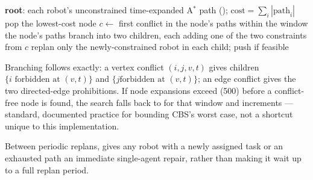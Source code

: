 \begin{algorithm}[H]
\caption{Windowed CBS ()}
\begin{algorithmic}[1]
\State \textbf{root}: each robot's unconstrained time-expanded A$^\ast$ path
  (); $\mathrm{cost} = \sum_i |\mathrm{path}_i|$
  \State pop the lowest-cost node
  \State $c \gets$ first conflict in the node's paths within the window
   \Return the node's paths \EndIf
  \State branch into two children, each adding one of the two constraints from $c$
  \State replan only the newly-constrained robot in each child; push if feasible
\EndWhile
\end{algorithmic}
\end{algorithm}

Branching follows \citet{sharon2015cbs} exactly: a vertex conflict $(i, j, v,
t)$ gives children $\{i \text{ forbidden at } (v,t)\}$ and $\{j \text{
forbidden at } (v,t)\}$; an edge conflict gives the two directed-edge
prohibitions. If node expansions exceed  (500)
before a conflict-free node is found, the search falls back to
 for that window and increments 
--- standard, documented practice for bounding CBS's worst case, not a shortcut
unique to this implementation.

Between periodic replans,  gives any robot with a
newly assigned task or an exhausted path an immediate single-agent repair,
rather than making it wait up to a full replan period.
